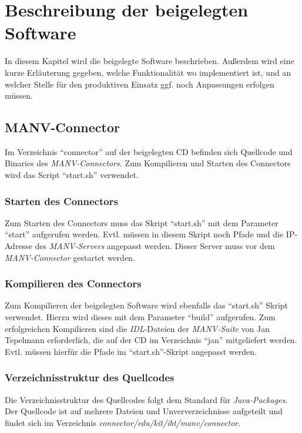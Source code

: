 \chapter{Beschreibung der beigelegten Software}\label{anhang_beschreibung_software}

    In diesem Kapitel wird die beigelegte Software beschrieben. Außerdem wird eine
    kurze Erläuterung gegeben, welche Funktionalität wo implementiert ist, und an
    welcher Stelle für den produktiven Einsatz ggf. noch Anpassungen erfolgen müssen.

    \section{MANV-Connector}
    Im Verzeichnis "`connector"' auf der beigelegten CD befinden sich
    Quellcode und Binaries des \emph{MANV-Connectors}. Zum Kompilieren
    und Starten des Connectors wird das Script "`start.sh"' verwendet.

    \subsection{Starten des Connectors}

    Zum Starten des Connectors muss das Skript "`start.sh"' mit dem Parameter
    "`start"' aufgerufen werden. Evtl. müssen in diesem Skript noch Pfade
    und die IP-Adresse des \emph{MANV-Servers} angepasst werden. 
    Dieser Server muss vor dem \emph{MANV-Connector} gestartet werden.

    \subsection{Kompilieren des Connectors}

    Zum Kompilieren der beigelegten Software wird ebenfalls das "`start.sh"'
    Skript verwendet. Hierzu wird dieses mit dem Parameter "`build"' aufgerufen.
    Zum erfolgreichen Kompilieren sind die \emph{IDL}-Dateien der \emph{MANV-Suite}
    von Jan Tepelmann erforderlich, die auf der CD im Verzeichnis "`jan"'
    mitgeliefert werden. Evtl. müssen hierfür die Pfade im "`start.sh"'-Skript 
    angepasst werden.

    \subsection{Verzeichnisstruktur des Quellcodes}

    Die Verzeichnisstruktur des Quellcodes folgt dem Standard für \emph{Java-Packages}.
    Der Quellcode ist auf mehrere Dateien und Unververzeichnisse aufgeteilt
    und findet sich im Verzeichnis \emph{connector/edu/kit/ibt/manv/connector}.
    

